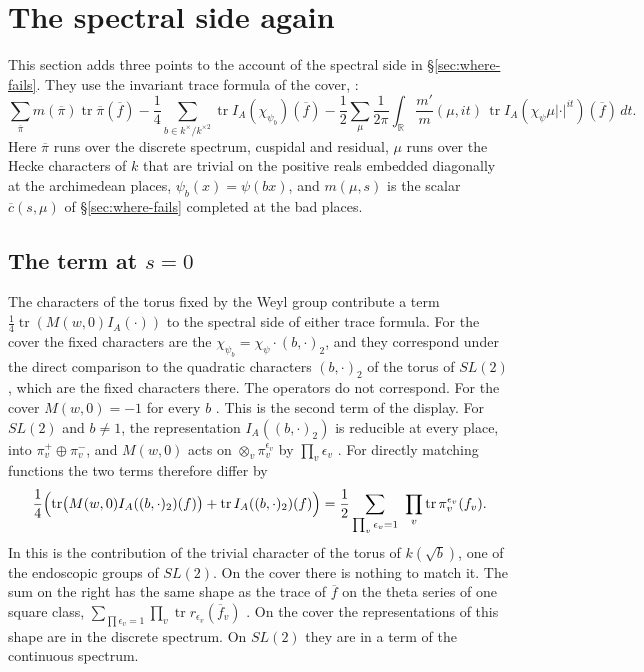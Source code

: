 \documentclass[12pt,letterpaper,openany]{book}
\theoremstyle{plain}
\theoremstyle{definition}
\theoremstyle{remark}
\theoremstyle{remark}
\newcommand{\tr}{\operatorname{tr}}
\begin{document}
\section{The spectral side again}\label{sec:cover-spectral}

This section adds three points to the account of the spectral side in
\S\ref{sec:where-fails}. They use the invariant trace formula of the
cover, \cite[Corollary~6.14]{JC}:
\[
\sum_{\overline\pi}m(\overline\pi)\tr\overline\pi(\overline f)
-\frac14\sum_{b\in k^\times/k^{\times2}}\tr I_A(\chi_{\psi_b})(\overline f)
-\frac12\sum_{\mu}\frac1{2\pi}\int_{\mathbb R}\frac{m'}{m}(\mu,it)\,
\tr I_A(\chi_\psi\mu|\cdot|^{it})(\overline f)\,dt .
\]
Here $\overline\pi$ runs over the discrete spectrum, cuspidal and
residual, $\mu$ runs over the Hecke characters of $k$ that are trivial on
the positive reals embedded diagonally at the archimedean places,
$\psi_b(x)=\psi(bx)$, and $m(\mu,s)$ is the scalar
$\overline c(s,\mu)$ of \S\ref{sec:where-fails} completed at the bad
places.

\subsection*{The term at $s=0$}

The characters of the torus fixed by the Weyl group contribute a term
$\frac14\tr(M(w,0)I_A(\cdot))$ to the spectral side of either trace
formula. For the cover the fixed characters are the
$\chi_{\psi_b}=\chi_\psi\cdot(b,\cdot)_2$, and they correspond under the
direct comparison to the quadratic characters $(b,\cdot)_2$ of the torus
of $SL(2)$, which are the fixed characters there. The operators do not
correspond. For the cover $M(w,0)=-1$ for every $b$
\cite[Proposition~6.13]{JC}. This is the second term of the display. For
$SL(2)$ and $b\neq1$, the representation $I_A((b,\cdot)_2)$ is reducible
at every place, into $\pi_v^+\oplus\pi_v^-$, and $M(w,0)$ acts on
$\otimes_v\pi_v^{\epsilon_v}$ by $\prod_v\epsilon_v$ \cite{LL}. For
directly matching functions the two terms therefore differ by
\[
\frac14\Bigl(\tr\bigl(M(w,0)I_A((b,\cdot)_2)(f)\bigr)
+\tr I_A((b,\cdot)_2)(f)\Bigr)
=\frac12\sum_{\prod_v\epsilon_v=1}\ \prod_v\tr\pi_v^{\epsilon_v}(f_v) .
\]
In \cite{LL} this is the contribution of the trivial character of the
torus of $k(\sqrt b)$, one of the endoscopic groups of $SL(2)$. On the
cover there is nothing to match it. The sum on the right has the same
shape as the trace of $\overline f$ on the theta series of one square
class, $\sum_{\prod\epsilon_v=1}\prod_v\tr r_{\epsilon_v}(\overline f_v)$
\cite[Proposition~7.12]{JC}. On the cover the representations of this
shape are in the discrete spectrum. On $SL(2)$ they are in a term of the
continuous spectrum.
\end{document}
